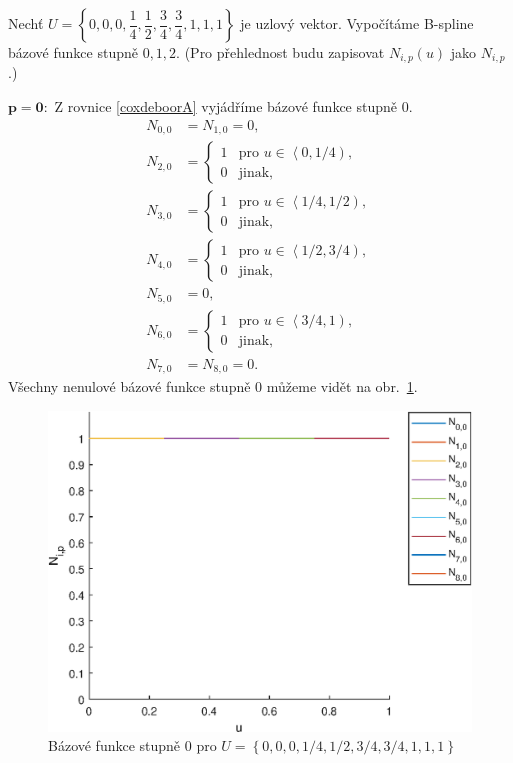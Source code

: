 \begin{priklad}
	Nechť $U=\left\lbrace 0,0,0,\dfrac{1}{4},\dfrac{1}{2},\dfrac{3}{4},\dfrac{3}{4},1,1,1 \right\rbrace$ je uzlový vektor. Vypočítáme B-spline bázové funkce stupně $0,1,2$. (Pro přehlednost budu zapisovat $N_{i,p}\left(u\right)$ jako $N_{i,p}$.)
	
	$\mathbf{p=0}:$
	Z rovnice \eqref{coxdeboorA} vyjádříme bázové funkce stupně 0.
	\begin{align*}
		N_{0,0}&=N_{1,0}=0,\\
	 	N_{2,0}&=
	 	\begin{cases}
	 		1 & \text{pro $u\in\left\langle 0,1/4 \right)$},\\
	 		0 & \text{jinak},
	 	\end{cases}\\
	 	N_{3,0}&=
	 	\begin{cases}
	 	1 & \text{pro $u\in\left\langle 1/4,1/2 \right)$},\\
	 	0 & \text{jinak},
	 	\end{cases}\\
	 	N_{4,0}&=
	 	\begin{cases}
	 	1 & \text{pro $u\in\left\langle 1/2,3/4 \right)$},\\
	 	0 & \text{jinak},
	 	\end{cases}\\
	 	N_{5,0}&=0, \\
	 	N_{6,0}&=
	 	\begin{cases}
	 	1 & \text{pro $u\in\left\langle 3/4,1 \right)$},\\
	 	0 & \text{jinak},
	 	\end{cases}\\
	 	N_{7,0}&=N_{8,0}=0.
	\end{align*}
	Všechny nenulové bázové funkce stupně 0 můžeme vidět na obr.~\ref{graf0}.
	\begin{figure}[!h]
		\begin{center}
			\includegraphics*[]{obr/graf0}
		\end{center}
		\caption{\sloppy Bázové funkce stupně 0 pro $U=\left\lbrace 0,0,0,1/4,1/2,3/4,3/4,1,1,1\right\rbrace $}
		\label{graf0}
	\end{figure}


\end{priklad}
